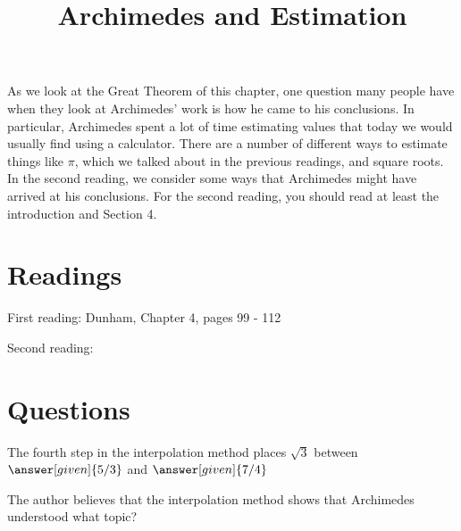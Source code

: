 \documentclass[nooutcomes]{ximera}
\title{Archimedes and Estimation}
\begin{document}
\begin{abstract}
    
\end{abstract}
\maketitle

As we look at the Great Theorem of this chapter, one question many people have when they look at Archimedes' work is how he came to his conclusions.  In particular, Archimedes spent a lot of time estimating values that today we would usually find using a calculator.  There are a number of different ways to estimate things like $\pi$, which we talked about in the previous readings, and square roots.  In the second reading, we consider some ways that Archimedes might have arrived at his conclusions.  For the second reading, you should read at least the introduction and Section 4.


\section{Readings}
First reading: Dunham, Chapter 4, pages 99 - 112

Second reading: 

\section{Questions}

\begin{question}
The fourth step in the interpolation method places $\sqrt{3}$ between $\answer[given]{5/3}$ and $\answer[given]{7/4}$
\end{question}

\begin{question}
The author believes that the interpolation method shows that Archimedes understood what topic?
\begin{multipleChoice}
\end{multipleChoice}
\end{question}



\end{document}
